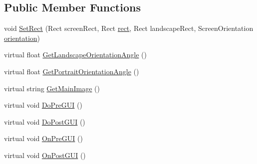 \subsection*{Public Member Functions}
\begin{DoxyCompactItemize}
\item 
void \hyperlink{class_unity_editor_1_1_u_i_1_1_windows_1_1_plugins_1_1_device_preview_1_1_output_1_1_device_output_base_a0c9f2688fbddc26c475f6c4ec0bde8bf}{Set\+Rect} (Rect screen\+Rect, Rect \hyperlink{class_unity_editor_1_1_u_i_1_1_windows_1_1_plugins_1_1_device_preview_1_1_output_1_1_device_output_base_af938549e0f8ab3839d213a90c6b5e5dc}{rect}, Rect landscape\+Rect, Screen\+Orientation \hyperlink{class_unity_editor_1_1_u_i_1_1_windows_1_1_plugins_1_1_device_preview_1_1_output_1_1_device_output_base_ad7f9d905e3f74946988fd47b693b6c82}{orientation})
\item 
virtual float \hyperlink{class_unity_editor_1_1_u_i_1_1_windows_1_1_plugins_1_1_device_preview_1_1_output_1_1_device_output_base_acacab4874b05a25830a617797fb6beff}{Get\+Landscape\+Orientation\+Angle} ()
\item 
virtual float \hyperlink{class_unity_editor_1_1_u_i_1_1_windows_1_1_plugins_1_1_device_preview_1_1_output_1_1_device_output_base_ae3bf39f4ac9f63c21d43b01b253b0222}{Get\+Portrait\+Orientation\+Angle} ()
\item 
virtual string \hyperlink{class_unity_editor_1_1_u_i_1_1_windows_1_1_plugins_1_1_device_preview_1_1_output_1_1_device_output_base_aaf4a55c205fbb5bb932982757984a95b}{Get\+Main\+Image} ()
\item 
virtual void \hyperlink{class_unity_editor_1_1_u_i_1_1_windows_1_1_plugins_1_1_device_preview_1_1_output_1_1_device_output_base_a04e326c26da466a96a3553e41a330a3c}{Do\+Pre\+G\+U\+I} ()
\item 
virtual void \hyperlink{class_unity_editor_1_1_u_i_1_1_windows_1_1_plugins_1_1_device_preview_1_1_output_1_1_device_output_base_a1ef420d828c4e7b9beb50982e71b3d81}{Do\+Post\+G\+U\+I} ()
\item 
virtual void \hyperlink{class_unity_editor_1_1_u_i_1_1_windows_1_1_plugins_1_1_device_preview_1_1_output_1_1_device_output_base_a5714400bba070bf266f7ac3fa2b1165b}{On\+Pre\+G\+U\+I} ()
\item 
virtual void \hyperlink{class_unity_editor_1_1_u_i_1_1_windows_1_1_plugins_1_1_device_preview_1_1_output_1_1_device_output_base_a42a03eacf0552d0b29c9a3c49883d5dd}{On\+Post\+G\+U\+I} ()
\end{DoxyCompactItemize}

